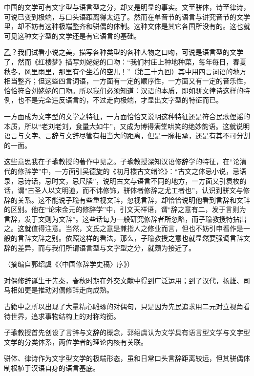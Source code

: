 \documentclass[11pt,a4paper]{ctexart}
\begin{document}
\begin{materialtext}
中国的文学可有文字型与语言型之分，却又是明显的事实。文至骈体，诗至律诗，可说已变到极端，与口头语距离得太远了。然而在单音节的语言与讲究音节的文学里，却不妨有这种极端整齐和骈偶的体制。这种文体是其它各国所没有的。这也就可见这种文字型的文学还是有它语言的基础。

\uline{\hspace{0.6em}乙\hspace{0.6em}}？我们试看小说之美，描写各种类型的各种人物之口吻，可说是语言型的文学了，然而《红楼梦》描写刘姥姥的口吻：“我们村庄上种地种菜，每年每日，春夏秋冬，风里雨里，那里有个坐着的空儿！”（第三十九回）其中用四言词语的地方相当整齐；但这些四言词语，一方面有一定的顺序性，一方面又有一定的音乐性，恰恰符合刘姥姥的口吻。所以我们必须知道：汉语的本质，即如骈文律诗这样的特例，也不是完全违反语言的，不过走向极端，才显出文字型的特征而已。

一方面成为文字型的文学之特征，一方面恰恰又说明这种特征还是符合民歌俚谣的本质，所以“老刘老刘，食量大如牛”，又成为博得满堂哄笑的绝妙韵语。这就说明语言与文字、言辞与文辞尽管有相当大的距离，但是一脉相承，还是有其不可分割的一面。

这些意思我在子瑜教授的著作中见之。子瑜教授深知汉语修辞学的特征，在“论清代的修辞学”中，一方面引吴德旋的《初月楼古文绪论》：“古文之体忌小说，忌语录，忌诗话，忌时文，忌尺牍”，说明古文与语言不同的地方，一方面又引袁枚的话，谓“古圣人以文明道，而不讳修饰，骈体者修辞之尤工者也”，认识到骈文与修辞的关系。这不能说子瑜有些重视文辞，忽视言辞，却恰恰说明他看到言辞和文辞的区别。他在“论宋金元的修辞学”中，引文天祥语，谓“辞之意有二，发于言则为言辞，发于文则为文辞”。这些话每为一般研究修辞者所忽略，而子瑜教授特拈出之。这就值得注意。当然，文氏之意是兼指人之修业而言，但也不妨引申看作是一般的言辞文辞之别。依照这样的看法，那么，子瑜教授之意也就显然要强调言辞文辞的差异，而与我们所谓语言型与文字型之分，就颇为接近了。
\end{materialtext}
\begin{flushright}（摘编自郭绍虞《〈中国修辞学史稿〉序》）\end{flushright}

\begin{choices}
\item 对偶修辞诞生于先秦，春秋时期在外交文献中得到广泛运用；到了汉代，扬雄、司马相如更是推动对偶修辞走向成熟。
\item 古籍中之所以出现了大量精心雕琢的对偶句，只是因为先民追求用二元对立视角看待世界，追求事物结构上的对称均衡。
\item 子瑜教授首先创设了言辞与文辞的概念，郭绍虞认为文学具有语言型文学与文字型文学的分类体系，两位学者的理论内核有关联。
\item 骈体、律诗作为文字型文学的极端形态，虽和日常口头言辞距离较远，但其骈偶体制根植于汉语自身的语言基底。
\end{choices}
\end{document}
